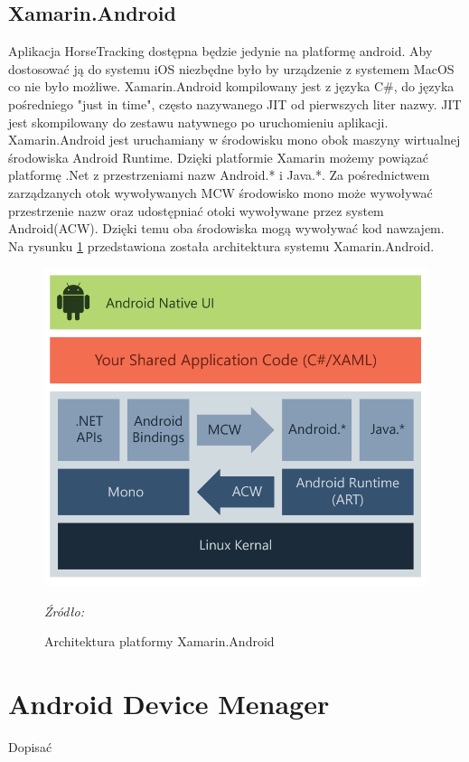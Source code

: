 \documentclass[12pt,oneside]{report}
\begin{document}
\subsection{Xamarin.Android}
Aplikacja HorseTracking dostępna będzie jedynie na platformę android. Aby dostosować ją do systemu iOS niezbędne było by urządzenie z systemem MacOS co nie było możliwe.
Xamarin.Android kompilowany jest z języka C\#, do języka pośredniego "just in time", często nazywanego JIT od pierwszych liter nazwy. JIT jest skompilowany do zestawu natywnego po uruchomieniu aplikacji. Xamarin.Android jest uruchamiany w środowisku mono obok maszyny wirtualnej środowiska Android Runtime. Dzięki platformie Xamarin możemy powiązać platformę .Net z przestrzeniami nazw Android.* i Java.*. Za pośrednictwem zarządzanych otok wywoływanych MCW środowisko mono może wywoływać przestrzenie nazw oraz udostępniać otoki wywoływane przez system Android(ACW). Dzięki temu oba środowiska mogą wywoływać kod nawzajem. Na rysunku \ref{AndroidArchitecture} przedstawiona została architektura systemu Xamarin.Android\cite{XamarinLearn}.
\begin{figure}[H]
	\centering
	\includegraphics[scale=0.3]{androidArchitecture}
	\caption{Architektura platformy Xamarin.Android}
	\textit{Źródło: \cite{XamarinLearn}}
	\label{AndroidArchitecture}
\end{figure}

\section{Android Device Menager}
{\color{red} Dopisać }
\end{document}
